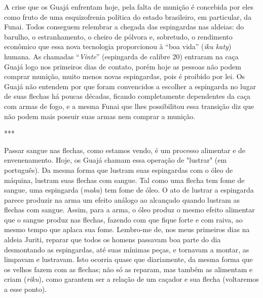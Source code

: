 A crise que os Guajá enfrentam hoje, pela falta de munição é concebida
por eles como fruto de uma esquizofrenia política do estado brasileiro,
em particular, da Funai. Todos conseguem relembrar a chegada das
espingardas nas aldeias: do barulho, o estranhamento, o cheiro de
pólvora e, sobretudo, o rendimento econômico que essa nova tecnologia
proporcionou à ``boa vida'' (\emph{iku katy}) humana. As chamadas
``\emph{Vinte}'' (espingarda de calibre 20) entraram na caça Guajá logo
nos primeiros dias de contato, porém hoje as pessoas não podem comprar
munição, muito menos novas espingardas, pois é proibido por lei. Os
Guajá não entendem por que foram convencidos a escolher a espingarda no
lugar de suas flechas há poucas décadas, ficando completamente
dependentes da caça com armas de fogo, e a mesma Funai que lhes
possibilitou essa transição diz que não podem mais possuir suas armas
nem comprar a munição.

***

Passar sangue nas flechas, como estamos vendo, é um processo alimentar e
de envenenamento. Hoje, os Guajá chamam essa operação de "lustrar" (em
português). Da mesma forma que lustram suas espingardas com o óleo de
máquina, lustram suas flechas com sangue. Tal como uma flecha tem fome
de sangue, uma espingarda (\emph{maka}) tem fome de óleo. O ato de
lustrar a espingarda parece produzir na arma um efeito análogo ao
alcançado quando lustram as flechas com sangue. Assim, para a arma, o
óleo produz o mesmo efeito alimentar que o sangue produz nas flechas,
fazendo com que fique forte e com raiva, ao mesmo tempo que aplaca sua
fome. Lembro-me de, nos meus primeiros dias na aldeia Juriti, reparar
que todos os homens passavam boa parte do dia desmontando as
espingardas, até suas mínimas peças, e tornavam a montar, as limpavam e
lustravam. Isto ocorria quase que diariamente, da mesma forma que os
velhos fazem com as flechas; não só as reparam, mas também as alimentam
e criam (\emph{riku}), como garantem ser a relação de um caçador e sua
flecha (voltaremos a esse ponto).

